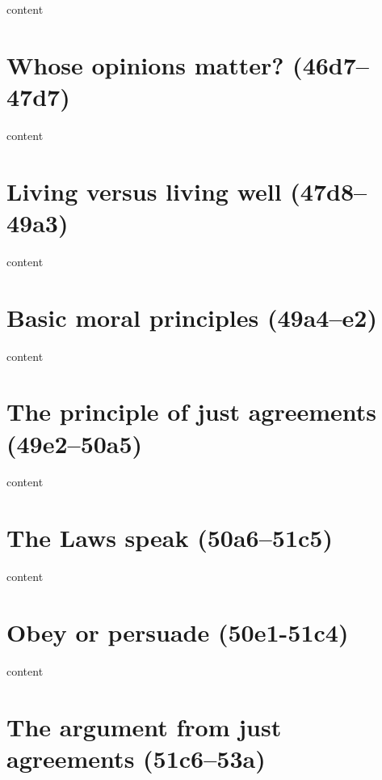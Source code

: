 \documentclass[11pt]{article}
\begin{document}
content

\section{Whose opinions matter? (46d7--47d7)}

content

\section{Living versus living well (47d8--49a3)}

content

\section{Basic moral principles (49a4--e2)}

content

\section{The principle of just agreements (49e2--50a5)}

content

\section{The Laws speak (50a6--51c5)}

content

\section{Obey or persuade (50e1-51c4)}

content

\section{The argument from just agreements (51c6--53a)}
\end{document}
